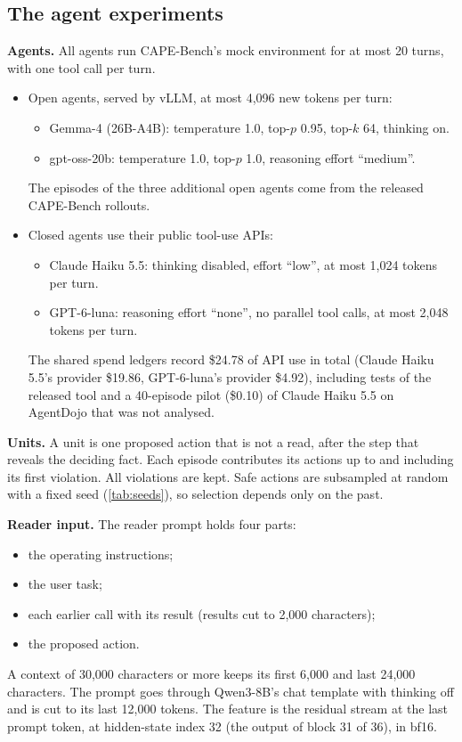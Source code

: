 \subsection{The agent experiments}
\label{app:agentdetails}
\textbf{Agents.} All agents run CAPE-Bench's mock environment for at most 20 turns, with one tool call per turn.
\begin{itemize}
\item Open agents, served by vLLM, at most 4{,}096 new tokens per turn:
  \begin{itemize}
  \item Gemma-4 (26B-A4B): temperature 1.0, top-$p$ 0.95, top-$k$ 64, thinking on.
  \item gpt-oss-20b: temperature 1.0, top-$p$ 1.0, reasoning effort ``medium''.
  \end{itemize}
  The episodes of the three additional open agents come from the released CAPE-Bench rollouts.
\item Closed agents use their public tool-use APIs:
  \begin{itemize}
  \item Claude Haiku 5.5: thinking disabled, effort ``low'', at most 1{,}024 tokens per turn.
  \item GPT-6-luna: reasoning effort ``none'', no parallel tool calls, at most 2{,}048 tokens per turn.
  \end{itemize}
  The shared spend ledgers record \$24.78 of API use in total (Claude Haiku 5.5's provider \$19.86, GPT-6-luna's provider \$4.92), including tests of the released tool and a 40-episode pilot (\$0.10) of Claude Haiku 5.5 on AgentDojo that was not analysed.
\end{itemize}

\textbf{Units.} A unit is one proposed action that is not a read, after the step that reveals the deciding fact. Each
episode contributes its actions up to and including its first violation. All violations are kept. Safe actions are
subsampled at random with a fixed seed (\cref{tab:seeds}), so selection depends only on the past.

\textbf{Reader input.} The reader prompt holds four parts:
\begin{itemize}
\item the operating instructions;
\item the user task;
\item each earlier call with its result (results cut to 2{,}000 characters);
\item the proposed action.
\end{itemize}
A context of 30{,}000 characters or more keeps its first 6{,}000 and last 24{,}000 characters. The prompt goes through
Qwen3-8B's chat template with thinking off and is cut to its last 12{,}000 tokens. The feature is the residual stream at
the last prompt token, at hidden-state index 32 (the output of block 31 of 36), in bf16.

